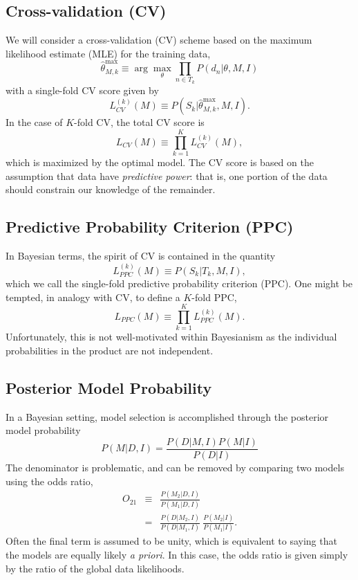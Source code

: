 \documentclass[12pt]{article}
\newcommand{\thetamax}[1]{\ensuremath{\hat{\theta}^{\max}_{#1}}}
\newcommand{\LCV}[1]{\ensuremath{L_{CV}}(#1)}
\newcommand{\LCVk}[1]{\ensuremath{L^{(k)}_{CV}}(#1)}
\newcommand{\LPPC}[1]{\ensuremath{L_{PPC}}(#1)}
\newcommand{\LPPCk}[1]{\ensuremath{L^{(k)}_{PPC}}(#1)}
\begin{document}
\subsection{Cross-validation (CV)}
We will consider a cross-validation (CV) scheme based on the 
maximum likelihood estimate (MLE) for the training data,
\begin{equation}
  \thetamax{M,k} \equiv \arg\max_\theta \prod_{n \in T_k} P(d_n|\theta, M, I)
\end{equation}
with a single-fold CV score given by
\begin{equation}
  \label{eq:LCVk}
  \LCVk{M} \equiv P(S_k | \thetamax{M,k}, M, I).
\end{equation}
In the case of $K$-fold CV, the total CV score is
\begin{equation}
  \label{eq:LCV}
  \LCV{M} \equiv \prod_{k=1}^K \LCVk{M},
\end{equation}
which is maximized by the optimal model.  The CV score is based on the
assumption that data have {\it predictive power}: that is, one portion
of the data should constrain our knowledge of the remainder.


\subsection{Predictive Probability Criterion (PPC)}
In Bayesian terms, the spirit of CV is contained in the quantity
\begin{equation}
  \label{eq:LPPCk}
  \LPPCk{M} \equiv P(S_k|T_k, M, I),
\end{equation}
which we call the single-fold predictive probability criterion (PPC).
One might be tempted, in analogy with CV, to define a $K$-fold PPC,
\begin{equation}
  \label{eq:LPPC}
  \LPPC{M} \equiv \prod_{k=1}^K \LPPCk{M}.
\end{equation}
Unfortunately, this is not well-motivated within Bayesianism
as the individual probabilities in the product are not independent.


\subsection{Posterior Model Probability}
In a Bayesian setting, model selection is accomplished through
the posterior model probability
\begin{equation}
  P(M|D,I) = \frac{P(D|M,I)P(M|I)}{P(D|I)}
\end{equation}
The denominator is problematic, and can be removed by comparing two
models using the odds ratio,
\begin{eqnarray}
  O_{21} &\equiv& \frac{P(M_2|D,I)}{P(M_1|D,I)}\\
        &=& \frac{P(D|M_2,I)}{P(D|M_1,I)}\ \frac{P(M_2|I)}{P(M_1|I)}.
\end{eqnarray}
Often the final term is assumed to be unity, which is equivalent to
saying that the models are equally likely {\it a priori}.  In this case, the
odds ratio is given simply by the ratio of the global data likelihoods.
\end{document}
